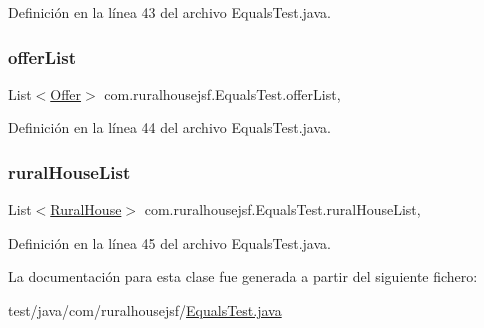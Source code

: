 Definición en la línea 43 del archivo Equals\+Test.\+java.

\mbox{\label{classcom_1_1ruralhousejsf_1_1_equals_test_abf5b3398125f0ed991c84afb429512f4}} 
\subsubsection{\texorpdfstring{offerList}{offerList}}
{\footnotesize\ttfamily List$<$\mbox{\hyperlink{classcom_1_1ruralhousejsf_1_1domain_1_1_offer}{Offer}}$>$ com.\+ruralhousejsf.\+Equals\+Test.\+offer\+List\hspace{0.3cm}{\ttfamily [static]}, {\ttfamily [package]}}



Definición en la línea 44 del archivo Equals\+Test.\+java.

\mbox{\label{classcom_1_1ruralhousejsf_1_1_equals_test_a9bdc3ab9b2c103383f6c34f253fe8307}} 
\subsubsection{\texorpdfstring{ruralHouseList}{ruralHouseList}}
{\footnotesize\ttfamily List$<$\mbox{\hyperlink{classcom_1_1ruralhousejsf_1_1domain_1_1_rural_house}{Rural\+House}}$>$ com.\+ruralhousejsf.\+Equals\+Test.\+rural\+House\+List\hspace{0.3cm}{\ttfamily [static]}, {\ttfamily [package]}}



Definición en la línea 45 del archivo Equals\+Test.\+java.



La documentación para esta clase fue generada a partir del siguiente fichero\+:\begin{DoxyCompactItemize}
\item 
test/java/com/ruralhousejsf/\mbox{\hyperlink{_equals_test_8java}{Equals\+Test.\+java}}\end{DoxyCompactItemize}
